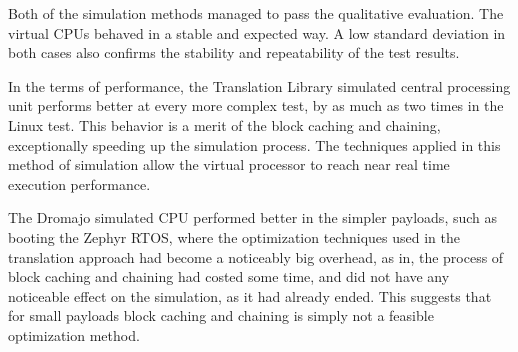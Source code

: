 \noindent
Both of the simulation methods managed to pass the qualitative evaluation. The virtual CPUs behaved in a stable
and expected way. A low standard deviation in both cases also confirms the stability and repeatability of the test
results.

In the terms of performance, the Translation Library simulated central processing unit performs better at every more
complex test, by as much as two times in the Linux test. This behavior is a merit of the block caching and chaining,
exceptionally speeding up the simulation process. The techniques applied in this method of simulation allow the virtual
processor to reach near real time execution performance.

The Dromajo simulated CPU performed better in the simpler payloads, such as booting the Zephyr RTOS, where the
optimization techniques used in the translation approach had become a noticeably big overhead, as in, the process of
block caching and chaining had costed some time, and did not have any noticeable effect on the simulation, as it had
already ended. This suggests that for small payloads block caching and chaining is simply not a feasible optimization
method.
